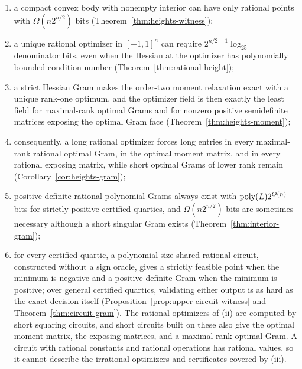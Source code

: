\begin{enumerate}[label=(\roman*)]
\item a compact convex body with nonempty interior can have only rational
  points with $\Omega(n2^{n/2})$ bits (Theorem~\ref{thm:heights-witness});
\item a unique rational optimizer in $[-1,1]^n$ can require
  $2^{n/2-1}\log_25$ denominator bits, even when the Hessian at the optimizer
  has polynomially bounded condition number
  (Theorem~\ref{thm:rational-height});
\item a strict Hessian Gram makes the order-two moment relaxation exact with
  a unique rank-one optimum, and the optimizer field is then exactly the
  least field for maximal-rank optimal Grams and for nonzero positive
  semidefinite matrices exposing the optimal Gram face
  (Theorem~\ref{thm:heights-moment});
\item consequently, a long rational optimizer forces long entries in every
  maximal-rank rational optimal Gram, in the optimal moment matrix, and in
  every rational exposing matrix, while short optimal Grams of lower rank
  remain (Corollary~\ref{cor:heights-gram});
\item positive definite rational polynomial Grams always exist with
  $\operatorname{poly}(L)2^{O(n)}$ bits for strictly positive certified quartics, and
  $\Omega(n2^{n/2})$ bits are sometimes necessary although a short singular
  Gram exists (Theorem~\ref{thm:interior-gram});
\item for every certified quartic, a polynomial-size shared rational circuit,
  constructed without a sign oracle, gives a strictly feasible point when the
  minimum is negative and a positive definite Gram when the minimum is
  positive; over general certified quartics, validating either output is as
  hard as the exact decision itself
  (Proposition~\ref{prop:upper-circuit-witness} and
  Theorem~\ref{thm:circuit-gram}). The rational optimizers of (ii) are
  computed by short squaring circuits, and short circuits built on these also
  give the optimal moment matrix, the exposing matrices, and a maximal-rank
  optimal Gram. A circuit with rational constants and rational operations has
  rational values, so it cannot describe the irrational optimizers and
  certificates covered by (iii).
\end{enumerate}

